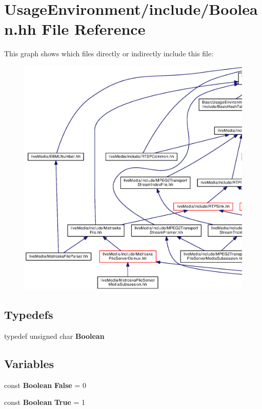\section{Usage\+Environment/include/\+Boolean.hh File Reference}
\label{Boolean_8hh}
This graph shows which files directly or indirectly include this file\+:
\nopagebreak
\begin{figure}[H]
\begin{center}
\leavevmode
\includegraphics[width=350pt]{Boolean_8hh__dep__incl}
\end{center}
\end{figure}
\subsection*{Typedefs}
\begin{DoxyCompactItemize}
\item 
typedef unsigned char {\bf Boolean}
\end{DoxyCompactItemize}
\subsection*{Variables}
\begin{DoxyCompactItemize}
\item 
const {\bf Boolean} {\bf False} = 0
\item 
const {\bf Boolean} {\bf True} = 1
\end{DoxyCompactItemize}


